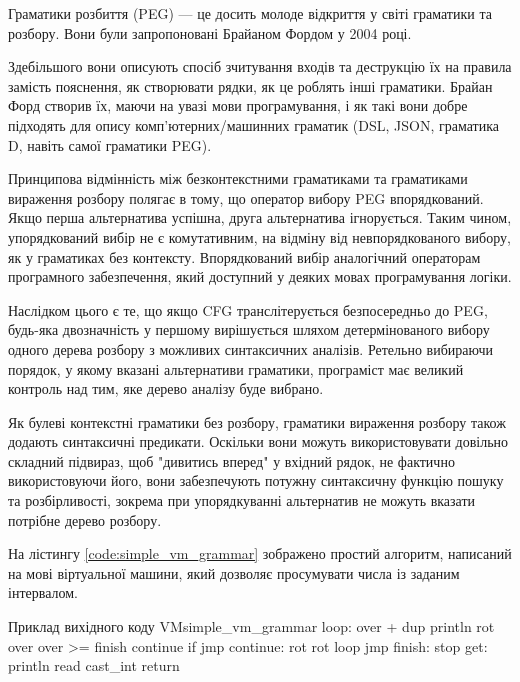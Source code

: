 \documentclass{lib/styles/default-style}
\begin{document}
    Граматики розбиття (PEG) --- це досить молоде відкриття у світі граматики та розбору.
    Вони були запропоновані Брайаном Фордом у 2004 році.

    Здебільшого вони описують спосіб зчитування входів та
    деструкцію їх на правила замість пояснення,
    як створювати рядки, як це роблять інші граматики.
    Брайан Форд створив їх, маючи на увазі мови програмування,
    і як такі вони добре підходять для опису комп'ютерних/машинних граматик (DSL, JSON, граматика D, навіть самої граматики PEG).

    Принципова відмінність між безконтекстними граматиками та граматиками вираження розбору
    полягає в тому, що оператор вибору PEG впорядкований.
    Якщо перша альтернатива успішна, друга альтернатива ігнорується.
    Таким чином, упорядкований вибір не є комутативним,
    на відміну від невпорядкованого вибору, як у граматиках без контексту.
    Впорядкований вибір аналогічний операторам програмного забезпечення, який доступний у деяких мовах програмування логіки.

    Наслідком цього є те, що якщо CFG транслітерується безпосередньо до
    PEG, будь-яка двозначність у першому вирішується шляхом детермінованого вибору одного
    дерева розбору з можливих синтаксичних аналізів.
    Ретельно вибираючи порядок, у якому вказані альтернативи
    граматики, програміст має великий контроль над тим, яке дерево аналізу буде вибрано.

    Як булеві контекстні граматики без розбору, граматики вираження розбору
    також додають синтаксичні предикати. Оскільки вони можуть використовувати довільно складний підвираз,
    щоб "дивитись вперед" у вхідний рядок, не фактично використовуючи його,
    вони забезпечують потужну синтаксичну функцію пошуку та розбірливості,
    зокрема при упорядкуванні альтернатив не можуть вказати потрібне дерево розбору.


    На лістингу \ref{code:simple_vm_grammar} зображено простий алгоритм, написаний на мові віртуальної машини,
    який дозволяє просумувати числа із заданим інтервалом.
    
    \begin{code}{Приклад вихідного коду VM}{simple_vm_grammar}        
        loop:
        over + dup println
        rot over over
        >= finish continue if jmp
        continue:
        rot rot
        loop jmp
        finish:
        stop
        get:
        println read cast_int return\end{code}
\end{document}
